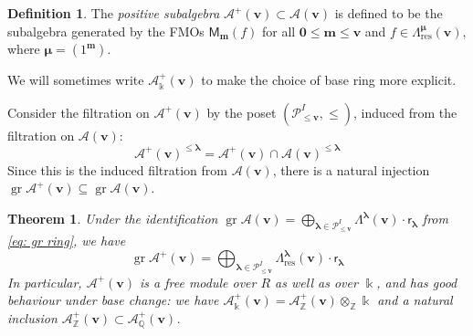 \documentclass[11pt,reqno]{amsart}
\renewcommand{\mathbf}{\mathbold}
\numberwithin{equation}{section}
\newtheorem{Theorem}[equation]{Theorem}
\theoremstyle{definition}
\newtheorem{Definition}[equation]{Definition}
\newcommand{\cA}{\mathcal{A}}
\newcommand{\cP}{\mathcal{P}}
\newcommand{\bm}{\mathbf{m}}
\newcommand{\bv}{\mathbf{v}}
\newcommand{\QQ}{\mathbb{Q}}
\newcommand{\ZZ}{\mathbb{Z}}
\DeclareMathOperator{\gr}{gr}
\newcommand{\kk}{\Bbbk}
\renewcommand{\bv}{\mathbf{v}} %
\newcommand{\M}{\mathsf{M}}
\newcommand{\sfr}{{\mathsf{r}}}
\newcommand{\vertexset}{I}
\newcommand{\GT}{\Lambda}
\newcommand{\base}{R}
\newcommand{\Partitions}{\cP}
\newcommand{\bla}{{\boldsymbol{\lambda}}}
\newcommand{\bmu}{{\boldsymbol{\mu}}}
\newcommand{\qzast}{\cA}
\newcommand{\qzastplus}{\cA^{+}}
\newcommand{\res}{\mathrm{res}}
\begin{document}
\begin{Definition}
    The \emph{positive subalgebra} $\qzastplus(\bv) \subset \qzast(\bv)$ is defined to be the subalgebra generated by the FMOs $\M_{\bm}(f)$ for all $\mathbf 0 \leq \bm \leq \bv$ and $f \in \GT_{\res}^\bmu(\bv)$, where $\bmu = (1^\bm)$.

    We will sometimes write $\qzastplus_\kk(\bv)$ to make the choice of base ring more explicit.

\end{Definition}


Consider the filtration  on $\qzastplus(\bv)$ by the poset $(\Partitions_{\leq \bv}^\vertexset, \leq)$, induced from the filtration on $\qzast(\bv)$:
\begin{equation}
    \qzastplus(\bv)^{\leq \bla} = \qzastplus(\bv) \cap \qzast(\bv)^{\leq \bla}    
\end{equation}
Since this is the induced filtration from $\qzast(\bv)$, there is a natural injection $\gr \qzastplus(\bv) \subseteq \gr \qzast(\bv)$.
\begin{Theorem}
    \label{thm:grpositivepart}
    Under the identification $\gr \qzast(\bv) = \bigoplus_{\bla \in \Partitions_{\leq \bv}^\vertexset} \GT^\bla(\bv) \cdot \sfr_\bla$ from \eqref{eq: gr ring}, we have 
    $$
    \gr \qzastplus(\bv) = \bigoplus_{\bla \in \Partitions_{\leq \bv}^\vertexset} \GT_{\res}^\bla(\bv) \cdot \sfr_\bla
    $$
    In particular, $\qzastplus(\bv)$ is a free module over $\base$ as well as  over $\kk$, and has good behaviour under base change: we have $\qzastplus_\kk(\bv) = \qzastplus_\ZZ(\bv) \otimes_\ZZ \kk$ and a natural inclusion $\qzastplus_\ZZ (\bv) \subset \qzastplus_\QQ(\bv)$.
\end{Theorem}
\end{document}
